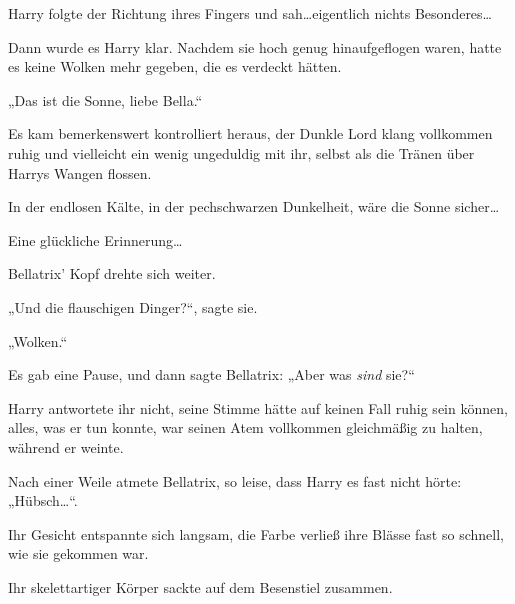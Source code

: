 Harry folgte der Richtung ihres Fingers und sah…eigentlich nichts Besonderes…

Dann wurde es Harry klar. Nachdem sie hoch genug hinaufgeflogen waren, hatte es keine Wolken mehr gegeben, die es verdeckt hätten.

„Das ist die Sonne, liebe Bella.“

Es kam bemerkenswert kontrolliert heraus, der Dunkle Lord klang vollkommen ruhig und vielleicht ein wenig ungeduldig mit ihr, selbst als die Tränen über Harrys Wangen flossen.

In der endlosen Kälte, in der pechschwarzen Dunkelheit, wäre die Sonne sicher…

Eine glückliche Erinnerung…

Bellatrix’ Kopf drehte sich weiter.

„Und die flauschigen Dinger?“, sagte sie.

„Wolken.“

Es gab eine Pause, und dann sagte Bellatrix:
„Aber was \emph{sind} sie?“

Harry antwortete ihr nicht, seine Stimme hätte auf keinen Fall ruhig sein können, alles, was er tun konnte, war seinen Atem vollkommen gleichmäßig zu halten, während er weinte.

Nach einer Weile atmete Bellatrix, so leise, dass Harry es fast nicht hörte:
„Hübsch…“.

Ihr Gesicht entspannte sich langsam, die Farbe verließ ihre Blässe fast so schnell, wie sie gekommen war.

Ihr skelettartiger Körper sackte auf dem Besenstiel zusammen.

